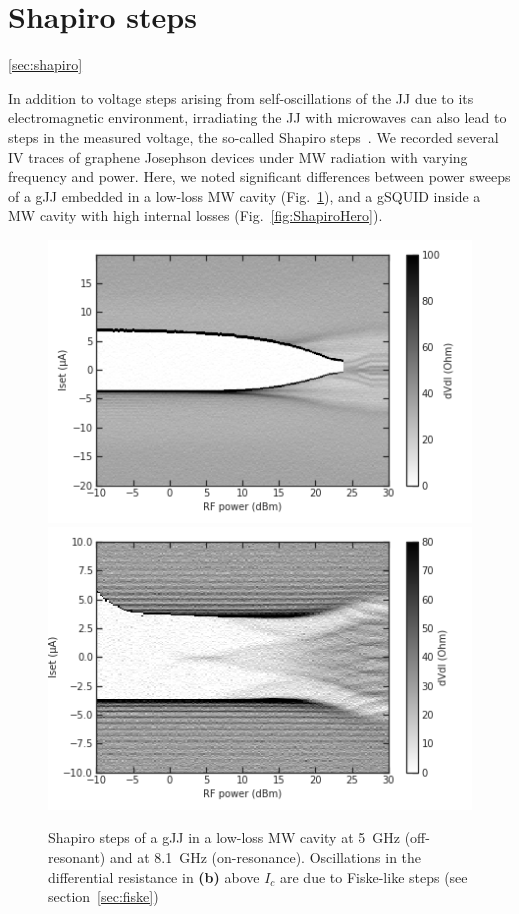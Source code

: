 \section{Shapiro steps}\ref{sec:shapiro}

In addition to voltage steps arising from self-oscillations of the JJ due to its electromagnetic environment, irradiating the JJ with microwaves can also lead to steps in the measured voltage, the so-called Shapiro steps~\cite{shapiroJosephsonCurrentsSuperconducting1963,kautzNoiseChaosJosephson1996,tinkhamIntroductionSuperconductivity1996,heerscheBipolarSupercurrentGraphene2007a,leeUltimatelyShortBallistic2015,shellyExistenceShapiroSteps2020,larsonZerobiasCrossingsPeculiar2020}.
%
We recorded several IV traces of graphene Josephson devices under MW radiation with varying frequency and power.
%
Here, we noted significant differences between power sweeps of a gJJ embedded in a low-loss MW cavity (Fig.~\ref{fig:Shapiro2x1}), and a gSQUID inside a MW cavity with high internal losses (Fig.~\ref{fig:ShapiroHero}).

\begin{figure}
	\centering
	\includegraphics[width=0.45\linewidth]{chapter-gJJ-misc/figs/processing_Shapiro_2x1_5GHz}
	\hfill
	\includegraphics[width=0.45\linewidth]{chapter-gJJ-misc/figs/processing_Shapiro_2x1_onres}
	\caption{
		Shapiro steps of a gJJ in a low-loss MW cavity at \SI{5}{\giga\hertz} (off-resonant) and at \SI{8.1}{\giga\hertz} (on-resonance).
		Oscillations in the differential resistance in \textbf{(b)} above $I_c$ are due to Fiske-like steps (see section~\ref{sec:fiske})
	}
	\label{fig:Shapiro2x1}
\end{figure}

